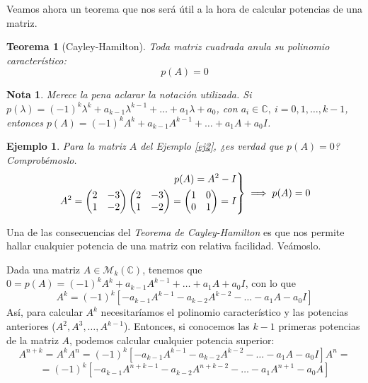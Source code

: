 \documentclass[11pt, a4paper]{article}
\newif\IfInSansMode
\numberwithin{equation}{section}
\newcommand{\pl}{p(\lambda)}
\theoremstyle{theorem-style}
\newtheorem{nth}{Teorema}[section]
\theoremstyle{definition-style}
\theoremstyle{remark-style}
\newtheorem*{nota}{Nota}
\theoremstyle{example-style}
\newtheorem{ejemplo}{Ejemplo}[section]
\newenvironment{rcases}
  {\left.\begin{aligned}}
  {\end{aligned}\right\rbrace}
\begin{document}
  Veamos ahora un teorema que nos será útil a la hora de calcular potencias de una matriz.

  \begin{nth}[Cayley-Hamilton]
    Toda matriz cuadrada anula su polinomio característico: $$p(A) = 0$$
  \end{nth}
  
  \begin{nota}
	Merece la pena aclarar la notación utilizada. Si $\pl = (-1)^k \lambda^k + a_{k-1}\lambda^{k-1} + \hdots + a_1\lambda + a_0$, con $a_i
  \in \mathbb C, \ i=0, 1, \hdots, k -1$, entonces $p(A) = (-1)^kA^k + a_{k-1}A^{k-1} + \hdots + a_1A + a_0I$.
\end{nota}

  \begin{ejemplo} Para la matriz $A$ del \textit{Ejemplo}  \eqref{ej2}, ¿es verdad que $p(A) = 0$? Comprobémoslo.
  $$\begin{rcases}
   p(A) = A^2 - I \\
    A^2 =
    \begin{pmatrix}
      2 & -3 \\
      1 & -2
    \end{pmatrix}
    \begin{pmatrix}
      2  & -3 \\
      1 & -2
    \end{pmatrix} =
    \begin{pmatrix}
      1 & 0 \\
      0 & 1
    \end{pmatrix} = I
    \end{rcases} \implies p(A) = 0$$
  \end{ejemplo}

  Una de las consecuencias del \textit{Teorema de Cayley-Hamilton} es que nos permite hallar cualquier potencia de una matriz con relativa facilidad. Veámoslo.

  Dada una matriz $A \in \mathcal M_k(\mathbb C)$, tenemos que  $0 = p(A) = (-1)^kA^k + a_{k-1}A^{k-1} + \hdots + a_1A + a_0I$, con lo
que $$A^k = (-1)^k\left[-a_{k-1}A^{k-1}-a_{k-2}A^{k-2} - \hdots - a_1A -
  a_0I\right]$$
Así, para calcular $A^k$ necesitaríamos el polinomio característico y las
potencias anteriores ($A^2, A^3, \hdots, A^{k-1}$). 
Entonces, si conocemos las $k-1$ primeras potencias de la matriz $A$, podemos calcular cualquier potencia superior: $$A^{n+k} = A^kA^n = (-1)^k\left[-a_{k-1}A^{k-1}-a_{k-2}A^{k-2} - \hdots - a_1A - a_0I\right] A^n =$$ $$=(-1)^k\left[-a_{k-1}A^{n+k-1}-a_{k-2}A^{n+k-2} - \hdots - a_1A^{n+1} - a_0A\right]$$
\end{document}
